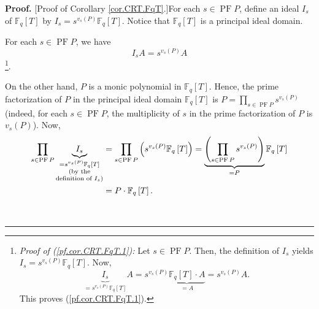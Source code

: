 \documentclass[numbers=enddot,12pt,final,onecolumn,notitlepage]{scrartcl}%
\theoremstyle{definition}
\newenvironment{proof}[1][Proof]{\noindent\textbf{#1.} }{\ \rule{0.5em}{0.5em}}
\let\prodnonlimits\prod
\renewcommand{\prod}{\prodnonlimits\limits}
\begin{document}
\begin{proof}
[Proof of Corollary \ref{cor.CRT.FqT}.]For each $s\in\operatorname*{PF}P$,
define an ideal $I_{s}$ of $\mathbb{F}_{q}\left[  T\right]  $ by
$I_{s}=s^{v_{s}\left(  P\right)  }\mathbb{F}_{q}\left[  T\right]  $. Notice
that $\mathbb{F}_{q}\left[  T\right]  $ is a principal ideal domain.

For each $s\in\operatorname*{PF}P$, we have%
\begin{equation}
I_{s}A=s^{v_{s}\left(  P\right)  }A \label{pf.cor.CRT.FqT.1}%
\end{equation}
\footnote{\textit{Proof of (\ref{pf.cor.CRT.FqT.1}):} Let $s\in
\operatorname*{PF}P$. Then, the definition of $I_{s}$ yields $I_{s}%
=s^{v_{s}\left(  P\right)  }\mathbb{F}_{q}\left[  T\right]  $. Now,%
\[
\underbrace{I_{s}}_{=s^{v_{s}\left(  P\right)  }\mathbb{F}_{q}\left[
T\right]  }A=s^{v_{s}\left(  P\right)  }\underbrace{\mathbb{F}_{q}\left[
T\right]  \cdot A}_{=A}=s^{v_{s}\left(  P\right)  }A.
\]
This proves (\ref{pf.cor.CRT.FqT.1}).}.

On the other hand, $P$ is a monic polynomial in $\mathbb{F}_{q}\left[
T\right]  $. Hence, the prime factorization of $P$ in the principal ideal
domain $\mathbb{F}_{q}\left[  T\right]  $ is $P=\prod_{s\in\operatorname*{PF}%
P}s^{v_{s}\left(  P\right)  }$ (indeed, for each $s\in\operatorname*{PF}P$,
the multiplicity of $s$ in the prime factorization of $P$ is $v_{s}\left(
P\right)  $). Now,%
\begin{align}
\prod\limits_{s\in\operatorname*{PF}P}\underbrace{I_{s}}_{\substack{=s^{v_{s}%
\left(  P\right)  }\mathbb{F}_{q}\left[  T\right]  \\\text{(by the}%
\\\text{definition of }I_{s}\text{)}}}  &  =\prod\limits_{s\in
\operatorname*{PF}P}\left(  s^{v_{s}\left(  P\right)  }\mathbb{F}_{q}\left[
T\right]  \right)  =\underbrace{\left(  \prod\limits_{s\in\operatorname*{PF}%
P}s^{v_{s}\left(  P\right)  }\right)  }_{=P}\mathbb{F}_{q}\left[  T\right]
\nonumber\\
&  =P\cdot\mathbb{F}_{q}\left[  T\right]  . \label{pf.cor.CRT.FqT.2}%
\end{align}



\end{proof}
\end{document}
